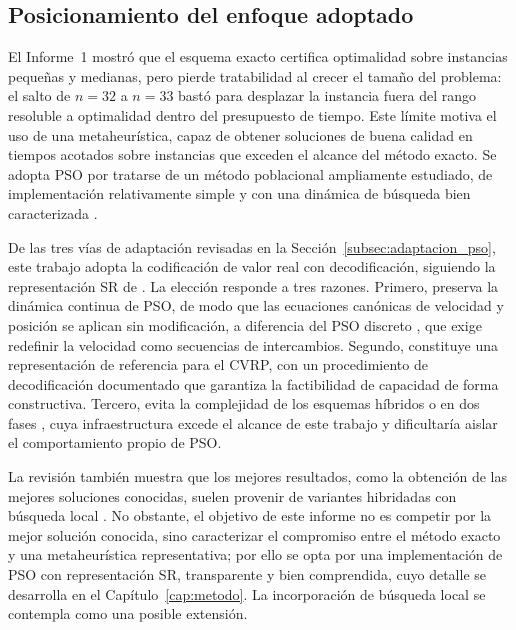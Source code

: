\subsection{Posicionamiento del enfoque adoptado}

El Informe~1 mostró que el esquema exacto certifica optimalidad sobre instancias pequeñas
y medianas, pero pierde tratabilidad al crecer el tamaño del problema: el salto de $n=32$
a $n=33$ bastó para desplazar la instancia fuera del rango resoluble a optimalidad dentro
del presupuesto de tiempo. Este límite motiva el uso de una metaheurística, capaz de
obtener soluciones de buena calidad en tiempos acotados sobre instancias que exceden el
alcance del método exacto. Se adopta PSO por tratarse de un método poblacional
ampliamente estudiado, de implementación relativamente simple y con una dinámica de
búsqueda bien caracterizada \parencite{poli2007particle}.

De las tres vías de adaptación revisadas en la Sección~\ref{subsec:adaptacion_pso}, este
trabajo adopta la codificación de valor real con decodificación, siguiendo la
representación SR de \textcite{ai2009particle}. La elección responde a tres razones.
Primero, preserva la dinámica continua de PSO, de modo que las ecuaciones canónicas de
velocidad y posición se aplican sin modificación, a diferencia del PSO discreto
\parencite{chen2006hybrid}, que exige redefinir la velocidad como secuencias de
intercambios. Segundo, constituye una representación de referencia para el CVRP, con un
procedimiento de decodificación documentado que garantiza la factibilidad de capacidad de
forma constructiva. Tercero, evita la complejidad de los esquemas híbridos o en dos fases
\parencite{son2021capacitated,kao2012hybrid}, cuya infraestructura excede el alcance de
este trabajo y dificultaría aislar el comportamiento propio de PSO.

La revisión también muestra que los mejores resultados, como la obtención de las mejores
soluciones conocidas, suelen provenir de variantes hibridadas con búsqueda local
\parencite{ahmed2018bilayer}. No obstante, el objetivo de este informe no es competir por
la mejor solución conocida, sino caracterizar el compromiso entre el método exacto y una
metaheurística representativa; por ello se opta por una implementación de PSO con
representación SR, transparente y bien comprendida, cuyo detalle se desarrolla en el
Capítulo~\ref{cap:metodo}. La incorporación de búsqueda local se contempla como una
posible extensión.